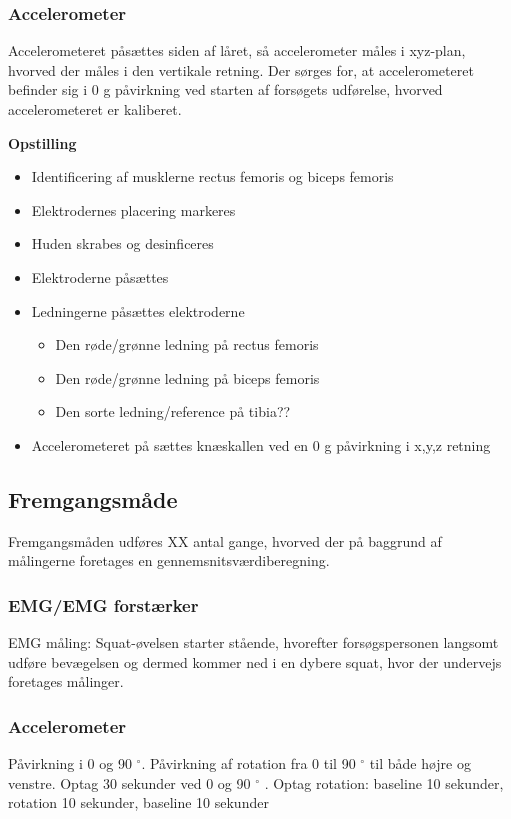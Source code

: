 \subsubsection{Accelerometer}
Accelerometeret påsættes siden af låret, så accelerometer måles i xyz-plan, hvorved der måles i den vertikale retning. Der sørges for,  at accelerometeret befinder sig i 0 g påvirkning ved starten af forsøgets udførelse, hvorved accelerometeret er kaliberet. 

\textbf{Opstilling}
\begin{itemize}
\item Identificering af musklerne rectus femoris og biceps femoris 
\item Elektrodernes placering markeres
\item Huden skrabes og desinficeres
\item Elektroderne påsættes
\item Ledningerne påsættes elektroderne
\begin{itemize}
\item Den røde/grønne ledning på rectus femoris
\item Den røde/grønne ledning på biceps femoris
\item Den sorte ledning/reference på tibia??
\end{itemize} 
\item Accelerometeret på sættes knæskallen ved en 0 g påvirkning i x,y,z retning
\end{itemize}


\subsection{Fremgangsmåde}
Fremgangsmåden udføres XX antal gange, hvorved der på baggrund af målingerne foretages en gennemsnitsværdiberegning.

\subsubsection{EMG/EMG forstærker}
EMG måling: Squat-øvelsen starter stående, hvorefter forsøgspersonen langsomt udføre bevægelsen og dermed kommer ned i en dybere squat, hvor der undervejs foretages målinger.

\subsubsection{Accelerometer}
Påvirkning i 0 og 90 $^{\circ}$.
Påvirkning af rotation fra 0 til 90 $^{\circ}$ til både højre og venstre.
Optag 30 sekunder ved 0 og 90 $^{\circ}$ .
Optag rotation: baseline 10 sekunder, rotation 10 sekunder, baseline 10 sekunder




